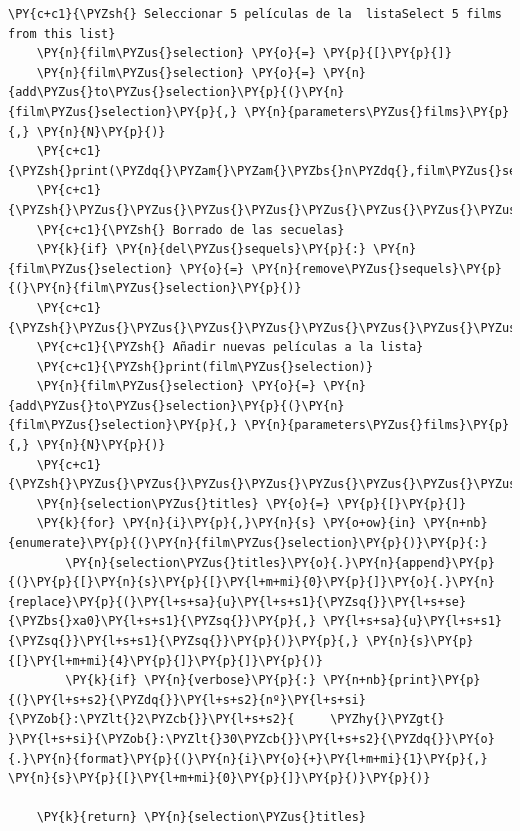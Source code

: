 \begin{tcolorbox}[breakable, size=fbox, boxrule=1pt, pad at break*=1mm,colback=cellbackground, colframe=cellborder]
\begin{Verbatim}[commandchars=\\\{\}]
    \PY{c+c1}{\PYZsh{} Seleccionar 5 películas de la  listaSelect 5 films from this list}
    \PY{n}{film\PYZus{}selection} \PY{o}{=} \PY{p}{[}\PY{p}{]}
    \PY{n}{film\PYZus{}selection} \PY{o}{=} \PY{n}{add\PYZus{}to\PYZus{}selection}\PY{p}{(}\PY{n}{film\PYZus{}selection}\PY{p}{,} \PY{n}{parameters\PYZus{}films}\PY{p}{,} \PY{n}{N}\PY{p}{)}
    \PY{c+c1}{\PYZsh{}print(\PYZdq{}\PYZam{}\PYZam{}\PYZbs{}n\PYZdq{},film\PYZus{}selection)}
    \PY{c+c1}{\PYZsh{}\PYZus{}\PYZus{}\PYZus{}\PYZus{}\PYZus{}\PYZus{}\PYZus{}\PYZus{}\PYZus{}\PYZus{}\PYZus{}\PYZus{}\PYZus{}\PYZus{}\PYZus{}\PYZus{}\PYZus{}\PYZus{}\PYZus{}\PYZus{}\PYZus{}\PYZus{}\PYZus{}\PYZus{}\PYZus{}\PYZus{}\PYZus{}\PYZus{}\PYZus{}\PYZus{}\PYZus{}\PYZus{}\PYZus{}\PYZus{}}
    \PY{c+c1}{\PYZsh{} Borrado de las secuelas}
    \PY{k}{if} \PY{n}{del\PYZus{}sequels}\PY{p}{:} \PY{n}{film\PYZus{}selection} \PY{o}{=} \PY{n}{remove\PYZus{}sequels}\PY{p}{(}\PY{n}{film\PYZus{}selection}\PY{p}{)}
    \PY{c+c1}{\PYZsh{}\PYZus{}\PYZus{}\PYZus{}\PYZus{}\PYZus{}\PYZus{}\PYZus{}\PYZus{}\PYZus{}\PYZus{}\PYZus{}\PYZus{}\PYZus{}\PYZus{}\PYZus{}\PYZus{}\PYZus{}\PYZus{}\PYZus{}\PYZus{}\PYZus{}\PYZus{}\PYZus{}\PYZus{}\PYZus{}\PYZus{}\PYZus{}\PYZus{}\PYZus{}\PYZus{}\PYZus{}\PYZus{}\PYZus{}\PYZus{}\PYZus{}\PYZus{}\PYZus{}\PYZus{}\PYZus{}\PYZus{}\PYZus{}\PYZus{}\PYZus{}\PYZus{}\PYZus{}\PYZus{}}
    \PY{c+c1}{\PYZsh{} Añadir nuevas películas a la lista}
    \PY{c+c1}{\PYZsh{}print(film\PYZus{}selection)}
    \PY{n}{film\PYZus{}selection} \PY{o}{=} \PY{n}{add\PYZus{}to\PYZus{}selection}\PY{p}{(}\PY{n}{film\PYZus{}selection}\PY{p}{,} \PY{n}{parameters\PYZus{}films}\PY{p}{,} \PY{n}{N}\PY{p}{)}
    \PY{c+c1}{\PYZsh{}\PYZus{}\PYZus{}\PYZus{}\PYZus{}\PYZus{}\PYZus{}\PYZus{}\PYZus{}\PYZus{}\PYZus{}\PYZus{}\PYZus{}\PYZus{}\PYZus{}\PYZus{}\PYZus{}\PYZus{}\PYZus{}\PYZus{}\PYZus{}\PYZus{}\PYZus{}\PYZus{}\PYZus{}\PYZus{}\PYZus{}\PYZus{}\PYZus{}\PYZus{}\PYZus{}\PYZus{}\PYZus{}\PYZus{}\PYZus{}\PYZus{}\PYZus{}\PYZus{}\PYZus{}\PYZus{}\PYZus{}\PYZus{}\PYZus{}\PYZus{}\PYZus{}\PYZus{}}
    \PY{n}{selection\PYZus{}titles} \PY{o}{=} \PY{p}{[}\PY{p}{]}
    \PY{k}{for} \PY{n}{i}\PY{p}{,}\PY{n}{s} \PY{o+ow}{in} \PY{n+nb}{enumerate}\PY{p}{(}\PY{n}{film\PYZus{}selection}\PY{p}{)}\PY{p}{:}
        \PY{n}{selection\PYZus{}titles}\PY{o}{.}\PY{n}{append}\PY{p}{(}\PY{p}{[}\PY{n}{s}\PY{p}{[}\PY{l+m+mi}{0}\PY{p}{]}\PY{o}{.}\PY{n}{replace}\PY{p}{(}\PY{l+s+sa}{u}\PY{l+s+s1}{\PYZsq{}}\PY{l+s+se}{\PYZbs{}xa0}\PY{l+s+s1}{\PYZsq{}}\PY{p}{,} \PY{l+s+sa}{u}\PY{l+s+s1}{\PYZsq{}}\PY{l+s+s1}{\PYZsq{}}\PY{p}{)}\PY{p}{,} \PY{n}{s}\PY{p}{[}\PY{l+m+mi}{4}\PY{p}{]}\PY{p}{]}\PY{p}{)}
        \PY{k}{if} \PY{n}{verbose}\PY{p}{:} \PY{n+nb}{print}\PY{p}{(}\PY{l+s+s2}{\PYZdq{}}\PY{l+s+s2}{nº}\PY{l+s+si}{\PYZob{}:\PYZlt{}2\PYZcb{}}\PY{l+s+s2}{     \PYZhy{}\PYZgt{} }\PY{l+s+si}{\PYZob{}:\PYZlt{}30\PYZcb{}}\PY{l+s+s2}{\PYZdq{}}\PY{o}{.}\PY{n}{format}\PY{p}{(}\PY{n}{i}\PY{o}{+}\PY{l+m+mi}{1}\PY{p}{,} \PY{n}{s}\PY{p}{[}\PY{l+m+mi}{0}\PY{p}{]}\PY{p}{)}\PY{p}{)}

    \PY{k}{return} \PY{n}{selection\PYZus{}titles}
\end{Verbatim}
\end{tcolorbox}

